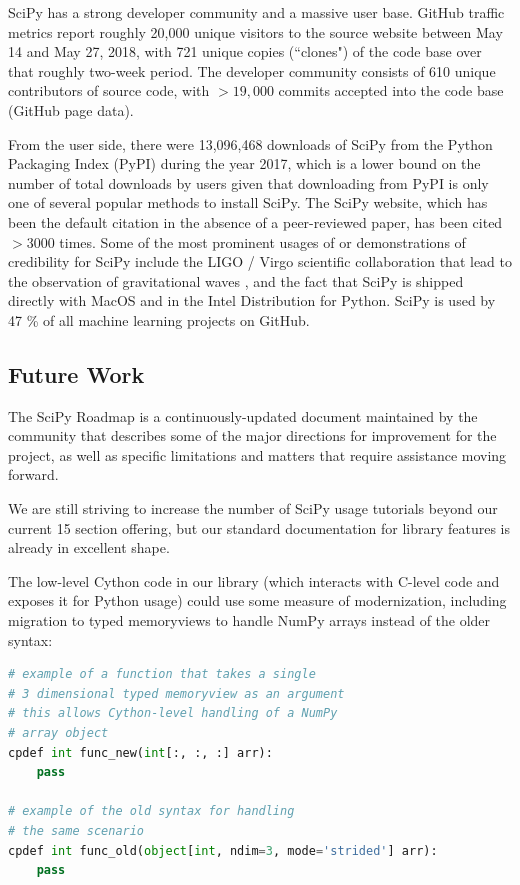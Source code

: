 \documentclass[fleqn,10pt]{wlscirep}
\begin{document}
SciPy has a strong developer community and a massive user base. GitHub traffic
metrics report roughly 20,000 unique visitors to the source website between May
14 and May 27, 2018, with 721 unique copies (``clones") of the code base over
that roughly two-week period. The developer community consists of 610 unique
contributors of source code, with $>19,000$ commits accepted into the code base
(GitHub page data).

From the user side, there were 13,096,468 downloads of SciPy from the Python
Packaging Index (PyPI) during the year 2017\cite{pypinfo}, which is a lower
bound on the number of total downloads by users given that downloading from
PyPI is only one of several popular methods to install SciPy.  The SciPy
website\cite{SciPylib}, which has been the default citation in the absence of a
peer-reviewed paper, has been cited $>3000$ times. Some of the most prominent
usages of or demonstrations of credibility for SciPy include the LIGO / Virgo
scientific collaboration that lead to the observation of gravitational waves
\cite{PhysRevLett.116.061102}, and the fact that SciPy is shipped directly with
MacOS and in the Intel Distribution for Python\cite{intel-python}. SciPy is used
by 47 \% of all machine learning projects on GitHub\cite{octoverse-scipy}.

\subsection*{Future Work}

The SciPy Roadmap\cite{SciPy_roadmap_1,SciPy_roadmap_dev} is a
continuously-updated document
maintained by the community that describes some of the major directions for
improvement for the project, as well as specific limitations and matters that
require assistance moving forward.

We are still striving to increase the number of SciPy usage tutorials beyond
our current 15 section offering\cite{SciPy_tutorials}, but our standard
documentation for library features is already in excellent shape.

The low-level Cython code in our library (which interacts with C-level code and
exposes it for Python usage) could use some measure of modernization, including
migration to typed memoryviews to handle NumPy arrays instead of the older
syntax:

\begin{lstlisting}[language=Python]
# example of a function that takes a single
# 3 dimensional typed memoryview as an argument
# this allows Cython-level handling of a NumPy
# array object
cpdef int func_new(int[:, :, :] arr):
    pass

# example of the old syntax for handling
# the same scenario
cpdef int func_old(object[int, ndim=3, mode='strided'] arr):
    pass
\end{lstlisting}
\end{document}
